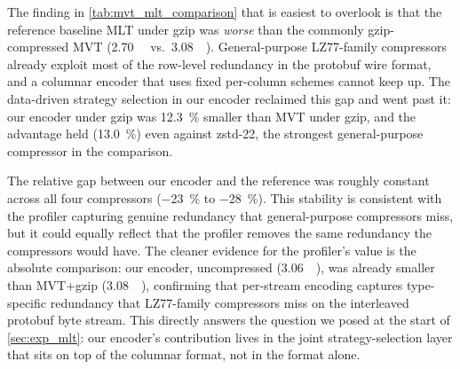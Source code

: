The finding in \cref{tab:mvt_mlt_comparison} that is easiest to overlook is that the reference baseline \ac{MLT} under gzip was \emph{worse} than the commonly gzip-compressed \ac{MVT} (\qty{2.70}{\giga\byte} vs.\ \qty{3.08}{\giga\byte}).
General-purpose LZ77-family compressors already exploit most of the row-level redundancy in the protobuf wire format, and a columnar encoder that uses fixed per-column schemes cannot keep up.
The data-driven strategy selection in our encoder reclaimed this gap and went past it: our encoder under gzip was \qty{12.3}{\percent} smaller than \ac{MVT} under gzip, and the advantage held (\qty{13.0}{\percent}) even against zstd-22, the strongest general-purpose compressor in the comparison.

The relative gap between our encoder and the reference was roughly constant across all four compressors (\qty{-23}{\percent} to \qty{-28}{\percent}).
This stability is consistent with the profiler capturing genuine redundancy that general-purpose compressors miss, but it could equally reflect that the profiler removes the same redundancy the compressors would have.
The cleaner evidence for the profiler's value is the absolute comparison: our encoder, uncompressed (\qty{3.06}{\giga\byte}), was already smaller than \ac{MVT}+gzip (\qty{3.08}{\giga\byte}), confirming that per-stream encoding captures type-specific redundancy that LZ77-family compressors miss on the interleaved protobuf byte stream.
This directly answers the question we posed at the start of \cref{sec:exp_mlt}: our encoder's contribution lives in the joint strategy-selection layer that sits on top of the columnar format, not in the format alone.

